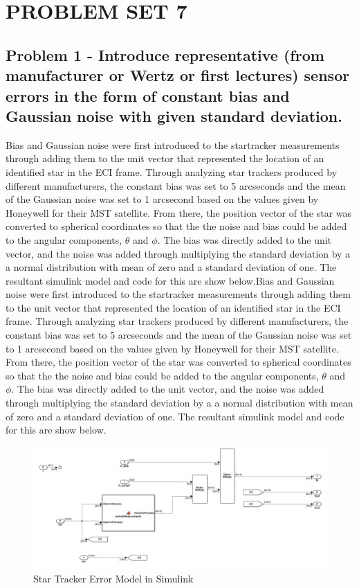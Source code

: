 \section{\Large PROBLEM SET 7}

\subsection{Problem 1 - Introduce representative (from manufacturer or Wertz or first lectures) sensor errors in the form of constant bias and Gaussian noise with given standard deviation.} \label{sec:hw7problem1}

Bias and Gaussian noise were first introduced to the startracker measurements through adding them to the unit vector that represented the location of an identified star in the ECI frame. Through analyzing star trackers produced by different manufacturers, the constant bias was set to 5 arcseconds and the mean of the Gaussian noise was set to 1 arcsecond based on the values given by Honeywell for their MST satellite. From there, the position vector of the star was converted to spherical coordinates so that the the noise and bias could be added to the angular components, $\theta$ and $\phi$. The bias was directly added to the unit vector, and the noise was added through multiplying the standard deviation by a a normal distribution with mean of zero and a standard deviation of one. The resultant simulink model and code for this are show below.Bias and Gaussian noise were first introduced to the startracker measurements through adding them to the unit vector that represented the location of an identified star in the ECI frame. Through analyzing star trackers produced by different manufacturers, the constant bias was set to 5 arcseconds and the mean of the Gaussian noise was set to 1 arcsecond based on the values given by Honeywell for their MST satellite. From there, the position vector of the star was converted to spherical coordinates so that the the noise and bias could be added to the angular components, $\theta$ and $\phi$. The bias was directly added to the unit vector, and the noise was added through multiplying the standard deviation by a a normal distribution with mean of zero and a standard deviation of one. The resultant simulink model and code for this are show below.

\begin{figure}[H]
    \centering
    \captionsetup{ justification = centering }
    \includegraphics[width = 15cm]{Images/PS7/starTrackerErrorSimulink.png}
    \caption{Star Tracker Error Model in Simulink}
    \label{fig:starTrackerErrorSimulink}
\end{figure}

